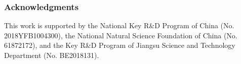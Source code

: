 \documentclass[letterpaper]{article} \usepackage{aaai20}  \usepackage{times}  \usepackage{helvet} \usepackage{courier}  \usepackage[hyphens]{url}  \usepackage{graphicx} \urlstyle{rm} \def\UrlFont{\rm}  \frenchspacing  \setlength{\pdfpagewidth}{8.5in}  \setlength{\pdfpageheight}{11in}  \usepackage{amsmath}
\begin{document}
\subsubsection*{Acknowledgments}
This work is supported by the National Key R\&D Program of China (No. 2018YFB1004300), the National Natural Science Foundation of China (No. 61872172), and the Key R\&D Program of Jiangsu Science and Technology Department (No. BE2018131).



\end{document}
